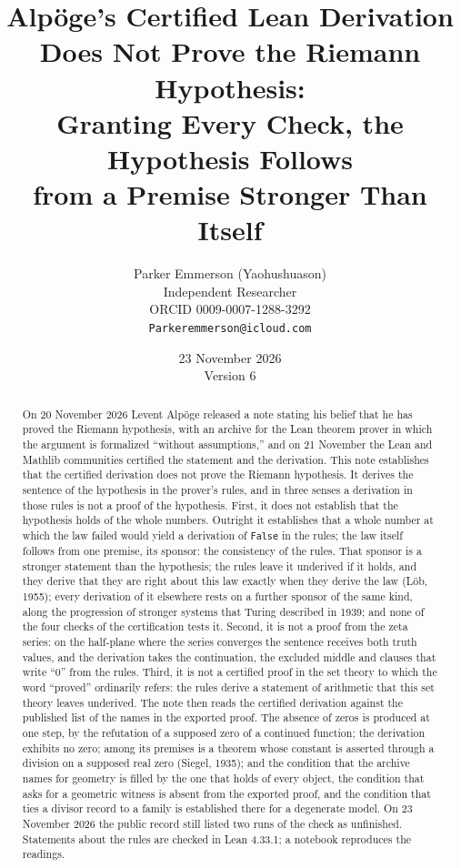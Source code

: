 \documentclass[11pt]{article}
\title{Alp\"oge's Certified Lean Derivation\\ Does Not Prove the Riemann Hypothesis:\\[4pt] \large Granting Every Check, the Hypothesis Follows\\ from a Premise Stronger Than Itself}
\author{Parker Emmerson (Yaohushuason)\\[2pt]
\small Independent Researcher\\
\small ORCID 0009-0007-1288-3292\\
\small \texttt{Parkeremmerson@icloud.com}}
\date{23 November 2026\\[2pt]\small Version 6}
\theoremstyle{definition}
\theoremstyle{remark}
\DeclareRobustCommand{\lean}[1]{{\renewcommand{\_}{\textunderscore\allowbreak}\texttt{#1}}}
\newcommand{\False}{\lean{False}}
\begin{document}
\maketitle


\begin{abstract}
On 20 November 2026 Levent Alp\"oge released a note stating his belief that he has proved the Riemann hypothesis, with an archive for the Lean theorem prover in which the argument is formalized ``without assumptions,'' and on 21 November the Lean and Mathlib communities certified the statement and the derivation. This note establishes that the certified derivation does not prove the Riemann hypothesis. It derives the sentence of the hypothesis in the prover's rules, and in three senses a derivation in those rules is not a proof of the hypothesis. First, it does not establish that the hypothesis holds of the whole numbers. Outright it establishes that a whole number at which the law failed would yield a derivation of \False{} in the rules; the law itself follows from one premise, its sponsor: the consistency of the rules. That sponsor is a stronger statement than the hypothesis; the rules leave it underived if it holds, and they derive that they are right about this law exactly when they derive the law (L\"ob, 1955); every derivation of it elsewhere rests on a further sponsor of the same kind, along the progression of stronger systems that Turing described in 1939; and none of the four checks of the certification tests it. Second, it is not a proof from the zeta series: on the half-plane where the series converges the sentence receives both truth values, and the derivation takes the continuation, the excluded middle and clauses that write ``0'' from the rules. Third, it is not a certified proof in the set theory to which the word ``proved'' ordinarily refers: the rules derive a statement of arithmetic that this set theory leaves underived. The note then reads the certified derivation against the published list of the names in the exported proof. The absence of zeros is produced at one step, by the refutation of a supposed zero of a continued function; the derivation exhibits no zero; among its premises is a theorem whose constant is asserted through a division on a supposed real zero (Siegel, 1935); and the condition that the archive names for geometry is filled by the one that holds of every object, the condition that asks for a geometric witness is absent from the exported proof, and the condition that ties a divisor record to a family is established there for a degenerate model. On 23 November 2026 the public record still listed two runs of the check as unfinished. Statements about the rules are checked in Lean 4.33.1; a notebook reproduces the readings.
\end{abstract}
\end{document}
